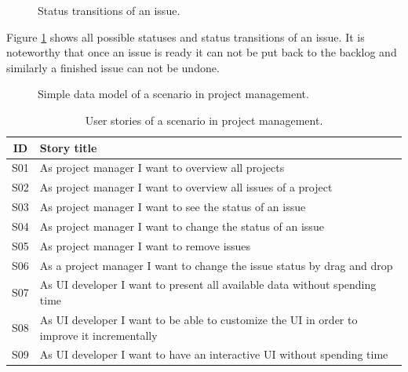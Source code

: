 \begin{figure}[!htb]
  \caption{Status transitions of an issue.}
  \label{fig:statetransition}
\end{figure}

Figure \ref{fig:statetransition} shows all possible statuses and status transitions of an issue. It is noteworthy that once an issue is ready it can not be put back to the backlog and similarly a finished issue can not be undone.

\begin{figure}[!htb]
  \caption{Simple data model of a scenario in project management.}
\end{figure}

\begin{table}
  \begin{center}
    \begin{tabular}{ |c|l| }
      \hline
      ID & Story title \\
      \hline
      S01 & As project manager I want to overview all projects \\
      S02 & As project manager I want to overview all issues of a project \\
      S03 & As project manager I want to see the status of an issue \\
      S04 & As project manager I want to change the status of an issue \\
      S05 & As project manager I want to remove issues \\
      S06 & As a project manager I want to change the issue status by drag and drop \\
      S07 & As UI developer I want to present all available data without spending time \\
      S08 & As UI developer I want to be able to customize the UI in order to improve it incrementally \\
      S09 & As UI developer I want to have an interactive UI without spending time \\
      \hline
    \end{tabular}
    \caption{User stories of a scenario in project management.}
    \label{tab:usecase2}
  \end{center}
\end{table}

